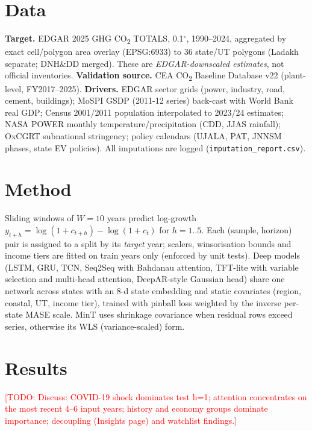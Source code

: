 \documentclass[conference]{IEEEtran}
\newcommand{\todo}[1]{\textcolor{red}{[TODO: #1]}}
\begin{document}
\section{Data}
\textbf{Target.} EDGAR 2025 GHG CO\textsubscript{2} TOTALS, 0.1$^\circ$, 1990--2024, aggregated by exact cell/polygon
area overlay (EPSG:6933) to 36 state/UT polygons (Ladakh separate; DNH\&DD merged). These are \emph{EDGAR-downscaled
estimates}, not official inventories. \textbf{Validation source.} CEA CO\textsubscript{2} Baseline Database v22
(plant-level, FY2017--2025). \textbf{Drivers.} EDGAR sector grids (power, industry, road, cement, buildings);
MoSPI GSDP (2011-12 series) back-cast with World Bank real GDP; Census 2001/2011 population interpolated to 2023/24
estimates; NASA POWER monthly temperature/precipitation (CDD, JJAS rainfall); OxCGRT subnational stringency; policy
calendars (UJALA, PAT, JNNSM phases, state EV policies). All imputations are logged (\texttt{imputation\_report.csv}).

\section{Method}
Sliding windows of $W{=}10$ years predict log-growth $y_{t+h}=\log(1{+}c_{t+h})-\log(1{+}c_t)$ for $h{=}1..5$. Each
(sample, horizon) pair is assigned to a split by its \emph{target} year; scalers, winsorisation bounds and income tiers
are fitted on train years only (enforced by unit tests). Deep models (LSTM, GRU, TCN, Seq2Seq with Bahdanau attention,
TFT-lite with variable selection and multi-head attention, DeepAR-style Gaussian head) share one network across states
with an 8-d state embedding and static covariates (region, coastal, UT, income tier), trained with pinball loss weighted by
the inverse per-state MASE scale. MinT uses shrinkage covariance when residual rows exceed series, otherwise its WLS
(variance-scaled) form.

\section{Results}
\begin{table}[t]\centering\caption{Test (2020--2024) accuracy, all states. MASE scaled by train-period naive-1 MAE.
$^\dagger$ARIMA fitted on the 10 largest emitters only.}\label{tab:test}
\resizebox{\columnwidth}{!}{}\end{table}
\begin{table}[t]\centering\caption{Validation (2015--2019) accuracy.}\label{tab:val}
\resizebox{\columnwidth}{!}{}\end{table}
\begin{table}[t]\centering\caption{Permutation importance of feature groups ($\Delta$ val MASE).}\label{tab:imp}
\resizebox{\columnwidth}{!}{}\end{table}
\todo{Discuss: COVID-19 shock dominates test h=1; attention concentrates on the most recent 4--6 input years;
history and economy groups dominate importance; decoupling (Insights page) and watchlist findings.}
\end{document}

